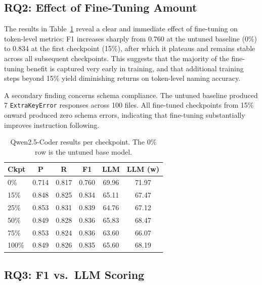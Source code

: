 \documentclass[conference]{IEEEtran}
\begin{document}
\subsection{RQ2: Effect of Fine-Tuning Amount}

The results in Table~\ref{tab:results-qwen} reveal a clear and immediate effect
of fine-tuning on token-level metrics: F1 increases sharply from 0.760 at the
untuned baseline (0\%) to 0.834 at the first checkpoint (15\%), after which it
plateaus and remains stable across all subsequent checkpoints.
This suggests that the majority of the fine-tuning benefit is captured very
early in training, and that additional training steps beyond 15\% yield
diminishing returns on token-level naming accuracy.

A secondary finding concerns schema compliance.
The untuned baseline produced 7 \texttt{ExtraKeyError} responses across 100
files.
All fine-tuned checkpoints from 15\% onward produced zero schema errors,
indicating that fine-tuning substantially improves instruction following.

\begin{table}[t]
  \centering
  \caption{Qwen2.5-Coder results per checkpoint. The 0\% row is the untuned base model.}
  \label{tab:results-qwen}
  \begin{tabular}{lccccc}
    \toprule
    \textbf{Ckpt} & \textbf{P} & \textbf{R} & \textbf{F1} &
    \textbf{LLM} & \textbf{LLM (w)} \\
    \midrule
    0\%   & 0.714 & 0.817 & 0.760 & 69.96 & 71.97 \\
    15\%  & 0.848 & 0.825 & 0.834 & 65.11 & 67.47 \\
    25\%  & 0.853 & 0.831 & 0.839 & 64.76 & 67.12 \\
    50\%  & 0.849 & 0.828 & 0.836 & 65.83 & 68.47 \\
    75\%  & 0.853 & 0.824 & 0.836 & 63.60 & 66.07 \\
    100\% & 0.849 & 0.826 & 0.835 & 65.60 & 68.19 \\
    \bottomrule
  \end{tabular}
\end{table}

\subsection{RQ3: F1 vs.\ LLM Scoring}
\end{document}
